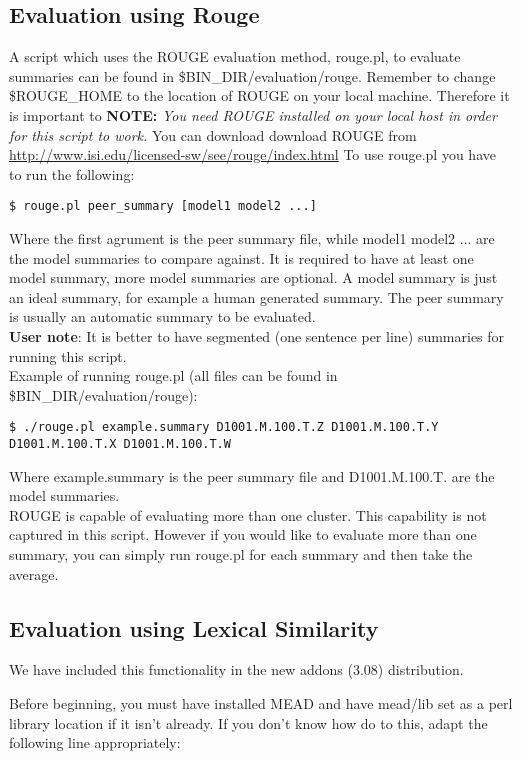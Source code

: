 \documentclass[10pt]{article}
\begin{document}
\subsection{Evaluation using Rouge}
A script which uses the ROUGE evaluation method, rouge.pl, to evaluate summaries can be found in \$BIN\_DIR/evaluation/rouge.
Remember to change \$ROUGE\_HOME to the location of ROUGE on your local machine.
Therefore it is important to {\bf NOTE: } {\em You need ROUGE installed on your local host in order for this script to work.}
You can download download ROUGE from \url{http://www.isi.edu/licensed-sw/see/rouge/index.html}
 To use rouge.pl you have to run the following:
\begin{verbatim}
$ rouge.pl peer_summary [model1 model2 ...]
\end{verbatim}
Where the first agrument is the peer summary file, while model1 model2 $...$ are the model summaries to compare against. 
It is required to have at least one model summary, more model summaries are optional.
A model summary is just an ideal summary, for example a human generated summary.
The peer summary is usually an automatic summary to be evaluated.\\
{\bf User note}: It is better to have segmented (one sentence per line) summaries for running this script.\\
Example of running rouge.pl (all files can be found in \$BIN\_DIR/evaluation/rouge):
\begin{verbatim}
$ ./rouge.pl example.summary D1001.M.100.T.Z D1001.M.100.T.Y D1001.M.100.T.X D1001.M.100.T.W
\end{verbatim} 
Where example.summary is the peer summary file and D1001.M.100.T.\* are the model summaries.\\
ROUGE is capable of evaluating more than one cluster.
This capability is not captured in this script.
However if you would like to evaluate more than one summary, you can simply run rouge.pl for each summary and then take the average.


\subsection{Evaluation using Lexical Similarity}

We have included this functionality in the new addons (3.08) distribution.

Before beginning, you must have installed MEAD and have mead/lib
set as a perl library location if it isn't already.  If you don't know
how do to this, adapt the following line appropriately:
\end{document}
